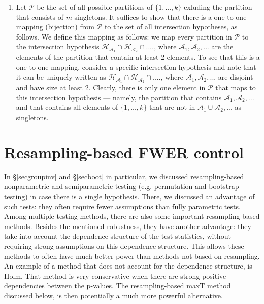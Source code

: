 \documentclass[11pt]{article}
\theoremstyle{plain}
\theoremstyle{definition}
\newcommand{\A}{\mathcal{A}}
\newcommand{\Hy}{\mathcal{H}}
\begin{document}
\begin{sols}
\begin{enumerate}
\item 
Let $\mathcal{P}$ be the set of all possible partitions of $\{1,...,k\}$ exluding the partition that consists of $m$ singletons.
It suffices to show that there is a one-to-one mapping (bijection) from $\mathcal{P}$ to the set of all intersection hypotheses, as follows. We define this mapping as follows: we map every partition in $\mathcal{P}$ to the intersection hypothesis $\Hy_{\A_1}\cap \Hy_{\A_2}\cap ....$, where $\A_1,\A_2,...$ are the elements of the partition that contain at least 2 elements. To see that this is a one-to-one mapping, consider a specific intersection hypothesis and note that it can be uniquely written as $\Hy_{\A_1}\cap \Hy_{\A_2}\cap ....$, where $\A_1,\A_2,...$ are disjoint and have size at least 2. Clearly, there is only one element in $\mathcal{P}$ that maps to this intersection hypothesis --- namely, the partition that contains $\A_1,\A_2,...$ and that contains all elements of $\{1,...,k\}$ that are not in $\A_1\cup\A_2,...$ as singletons.

\end{enumerate}

\end{sols}

\newpage

\section{Resampling-based FWER control} \label{secresamplingFWER}
In \S\ref{secgroupinv} and \S\ref{secboot} in particular, we discussed resampling-based nonparametric and semiparametric testing (e.g. permutation and bootstrap testing) in case there is a single hypothesis. There, we discussed an advantage of such tests: they often require fewer assumptions than fully parametric tests. Among multiple testing methods, there are also some important resampling-based methods. Besides the mentioned robustness, they have another advantage: they take into account the dependence structure of the test statistics, without requiring strong assumptions on this dependence structure. This allows these methods to often have 
much better power than methods not based on resampling. An example of a method that does not account for the dependence structure, is Holm. That method is very conservative when there are strong positive dependencies between the p-values. The resampling-based maxT method discussed below, is then potentially a much more powerful alternative.
\end{document}
